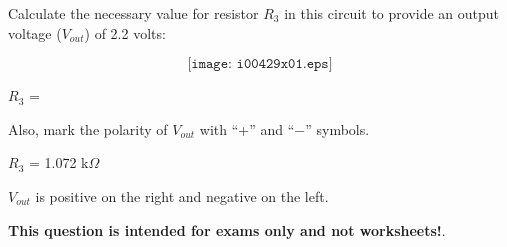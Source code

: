 

Calculate the necessary value for resistor $R_3$ in this circuit to provide an output voltage ($V_{out}$) of 2.2 volts:

$$\texttt{[image: i00429x01.eps]}$$

$R_3$ = 

\vskip 10pt

Also, mark the polarity of $V_{out}$ with ``+'' and ``$-$'' symbols.

\vskip 10pt







$R_3$ = 1.072 k$\Omega$

\vskip 10pt

$V_{out}$ is positive on the right and negative on the left.







{\bf This question is intended for exams only and not worksheets!}.


